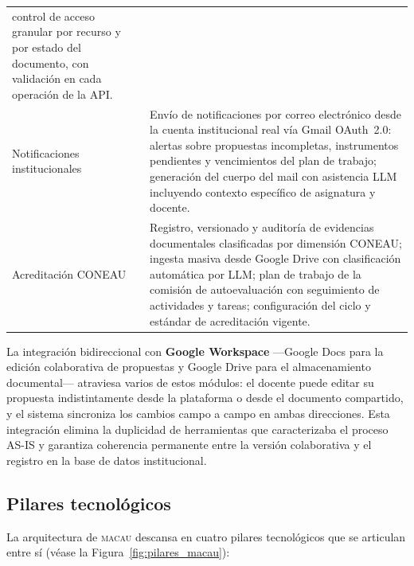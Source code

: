 \begin{longtable}{p{3.6cm} p{10.8cm}}
    control de acceso granular por recurso y por estado del documento, con
    validación en cada operación de la API. \\
\arrayrulecolor{gray!35}\hline\arrayrulecolor{black}
Notificaciones institucionales
  & Envío de notificaciones por correo electrónico desde la cuenta institucional
    real vía Gmail OAuth~2.0: alertas sobre propuestas incompletas, instrumentos
    pendientes y vencimientos del plan de trabajo; generación del cuerpo del mail
    con asistencia LLM incluyendo contexto específico de asignatura y docente. \\
\arrayrulecolor{gray!35}\hline\arrayrulecolor{black}
Acreditación CONEAU
  & Registro, versionado y auditoría de evidencias documentales clasificadas por
    dimensión CONEAU; ingesta masiva desde Google Drive con clasificación automática
    por LLM; plan de trabajo de la comisión de autoevaluación con seguimiento de
    actividades y tareas; configuración del ciclo y estándar de acreditación vigente. \\
\end{longtable}

La integración bidireccional con \textbf{Google Workspace} ---Google Docs para
la edición colaborativa de propuestas y Google Drive para el almacenamiento
documental--- atraviesa varios de estos módulos: el docente puede editar su propuesta
indistintamente desde la plataforma o desde el documento compartido, y el sistema
sincroniza los cambios campo a campo en ambas direcciones.
Esta integración elimina la duplicidad de herramientas que caracterizaba el proceso AS-IS
y garantiza coherencia permanente entre la versión colaborativa y el registro en la base
de datos institucional.

\subsection{Pilares tecnológicos}

La arquitectura de \textsc{macau} descansa en cuatro pilares tecnológicos
que se articulan entre sí (véase la Figura~\ref{fig:pilares_macau}):

